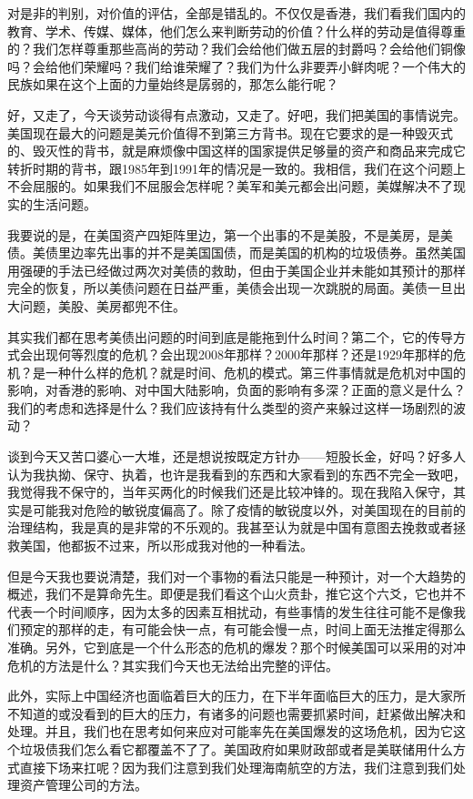 \documentclass[UTF8, 12pt, a4paper]{ctexrep}
\begin{document}
对是非的判别，对价值的评估，全部是错乱的。不仅仅是香港，我们看我们国内的教育、学术、传媒、媒体，他们怎么来判断劳动的价值？什么样的劳动是值得尊重的？我们怎样尊重那些高尚的劳动？我们会给他们做五层的封爵吗？会给他们铜像吗？会给他们荣耀吗？我们给谁荣耀了？我们为什么非要弄小鲜肉呢？一个伟大的民族如果在这个上面的力量始终是孱弱的，那怎么能行呢？

好，又走了，今天谈劳动谈得有点激动，又走了。好吧，我们把美国的事情说完。美国现在最大的问题是美元价值得不到第三方背书。现在它要求的是一种毁灭式的、毁灭性的背书，就是麻烦像中国这样的国家提供足够量的资产和商品来完成它转折时期的背书，跟1985年到1991年的情况是一致的。我相信，我们在这个问题上不会屈服的。如果我们不屈服会怎样呢？美军和美元都会出问题，美媒解决不了现实的生活问题。

我要说的是，在美国资产四矩阵里边，第一个出事的不是美股，不是美房，是美债。美债里边率先出事的并不是美国国债，而是美国的机构的垃圾债券。虽然美国用强硬的手法已经做过两次对美债的救助，但由于美国企业并未能如其预计的那样完全的恢复，所以美债问题在日益严重，美债会出现一次跳脱的局面。美债一旦出大问题，美股、美房都兜不住。

其实我们都在思考美债出问题的时间到底是能拖到什么时间？第二个，它的传导方式会出现何等烈度的危机？会出现2008年那样？2000年那样？还是1929年那样的危机？是一种什么样的危机？就是时间、危机的模式。第三件事情就是危机对中国的影响，对香港的影响、对中国大陆影响，负面的影响有多深？正面的意义是什么？我们的考虑和选择是什么？我们应该持有什么类型的资产来躲过这样一场剧烈的波动？

谈到今天又苦口婆心一大堆，还是想说按既定方针办——短股长金，好吗？好多人认为我执拗、保守、执着，也许是我看到的东西和大家看到的东西不完全一致吧，我觉得我不保守的，当年买两化的时候我们还是比较冲锋的。现在我陷入保守，其实是可能我对危险的敏锐度偏高了。除了疫情的敏锐度以外，对美国现在的目前的治理结构，我是真的是非常的不乐观的。我甚至认为就是中国有意图去挽救或者拯救美国，他都扳不过来，所以形成我对他的一种看法。

但是今天我也要说清楚，我们对一个事物的看法只能是一种预计，对一个大趋势的概述，我们不是算命先生。即便是我们看这个山火贲卦，推它这个六爻，它也并不代表一个时间顺序，因为太多的因素互相扰动，有些事情的发生往往可能不是像我们预定的那样的走，有可能会快一点，有可能会慢一点，时间上面无法推定得那么准确。另外，它到底是一个什么形态的危机的爆发？那个时候美国可以采用的对冲危机的方法是什么？其实我们今天也无法给出完整的评估。

此外，实际上中国经济也面临着巨大的压力，在下半年面临巨大的压力，是大家所不知道的或没看到的巨大的压力，有诸多的问题也需要抓紧时间，赶紧做出解决和处理。并且，我们也在思考如何来应对可能率先在美国爆发的这场危机，因为它这个垃圾债我们怎么看它都覆盖不了了。美国政府如果财政部或者是美联储用什么方式直接下场来扛呢？因为我们注意到我们处理海南航空的方法，我们注意到我们处理资产管理公司的方法。
\end{document}
